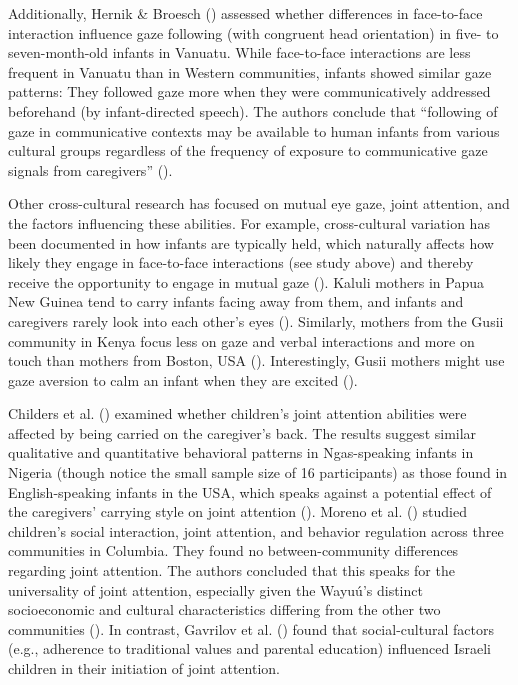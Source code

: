 \documentclass[
]{scrbook}
\begin{document}
Additionally, Hernik \& Broesch () assessed whether differences in face-to-face interaction influence gaze following (with congruent head orientation) in five- to seven-month-old infants in Vanuatu. While face-to-face interactions are less frequent in Vanuatu than in Western communities, infants showed similar gaze patterns: They followed gaze more when they were communicatively addressed beforehand (by infant-directed speech). The authors conclude that ``following of gaze in communicative contexts may be available to human infants from various cultural groups regardless of the frequency of exposure to communicative gaze signals from caregivers'' ().

Other cross-cultural research has focused on mutual eye gaze, joint attention, and the factors influencing these abilities. For example, cross-cultural variation has been documented in how infants are typically held, which naturally affects how likely they engage in face-to-face interactions (see study above) and thereby receive the opportunity to engage in mutual gaze (). Kaluli mothers in Papua New Guinea tend to carry infants facing away from them, and infants and caregivers rarely look into each other's eyes (). Similarly, mothers from the Gusii community in Kenya focus less on gaze and verbal interactions and more on touch than mothers from Boston, USA (). Interestingly, Gusii mothers might use gaze aversion to calm an infant when they are excited ().

Childers et al. () examined whether children's joint attention abilities were affected by being carried on the caregiver's back. The results suggest similar qualitative and quantitative behavioral patterns in Ngas-speaking infants in Nigeria (though notice the small sample size of 16 participants) as those found in English-speaking infants in the USA, which speaks against a potential effect of the caregivers' carrying style on joint attention (). Moreno et al. () studied children's social interaction, joint attention, and behavior regulation across three communities in Columbia. They found no between-community differences regarding joint attention. The authors concluded that this speaks for the universality of joint attention, especially given the Wayuú's distinct socioeconomic and cultural characteristics differing from the other two communities (). In contrast, Gavrilov et al. () found that social-cultural factors (e.g., adherence to traditional values and parental education) influenced Israeli children in their initiation of joint attention.
\end{document}
